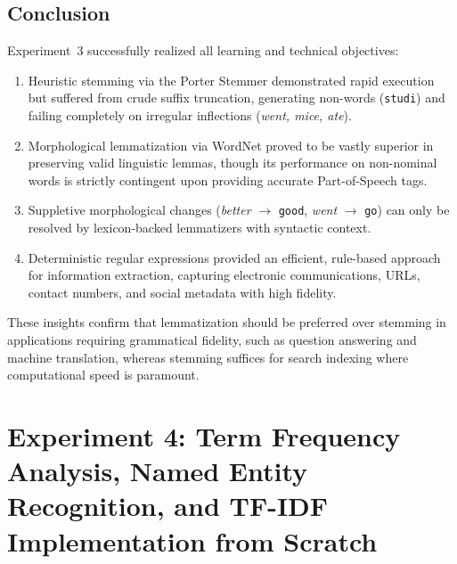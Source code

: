 \documentclass[12pt,a4paper]{report}
\begin{document}
\section{Conclusion}
Experiment~3 successfully realized all learning and technical objectives:
\begin{enumerate}
    \item Heuristic stemming via the Porter Stemmer demonstrated rapid execution but suffered from crude suffix truncation, generating non-words (\texttt{studi}) and failing completely on irregular inflections (\textit{went, mice, ate}).
    \item Morphological lemmatization via WordNet proved to be vastly superior in preserving valid linguistic lemmas, though its performance on non-nominal words is strictly contingent upon providing accurate Part-of-Speech tags.
    \item Suppletive morphological changes (\textit{better} $\to$ \texttt{good}, \textit{went} $\to$ \texttt{go}) can only be resolved by lexicon-backed lemmatizers with syntactic context.
    \item Deterministic regular expressions provided an efficient, rule-based approach for information extraction, capturing electronic communications, URLs, contact numbers, and social metadata with high fidelity.
\end{enumerate}
These insights confirm that lemmatization should be preferred over stemming in applications requiring grammatical fidelity, such as question answering and machine translation, whereas stemming suffices for search indexing where computational speed is paramount.



\chapter{Experiment 4: Term Frequency Analysis, Named Entity Recognition, and TF-IDF Implementation from Scratch}
\label{chap:exp4}
\end{document}
